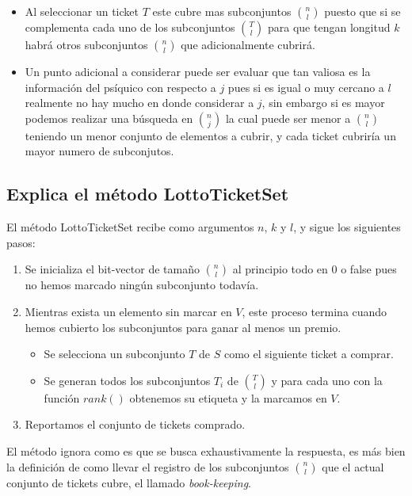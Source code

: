\documentclass[12pt]{article}
\begin{document}
 \begin{itemize}
	\item Al seleccionar un ticket $T$ este cubre mas subconjuntos  ${n}\choose{l}$ puesto que si se complementa cada uno de los subconjuntos ${T}\choose{l}$  para que tengan longitud $k$ habrá otros subconjuntos  ${n}\choose{l}$ que adicionalmente cubrirá.
	\item Un punto adicional a considerar puede ser evaluar que tan valiosa es la información del psíquico con respecto a $j$ pues si es igual o muy cercano a $l$ realmente no hay mucho en donde considerar a $j$, sin embargo si es mayor podemos realizar una búsqueda en ${n}\choose{j}$ la cual puede ser menor a ${n}\choose{l}$ teniendo un menor conjunto de elementos a cubrir, y cada ticket cubriría un mayor numero de subconjutos.
\end{itemize}
\subsection{Explica el método LottoTicketSet}
El método LottoTicketSet recibe como argumentos $n$, $k$ y $l$, y sigue los siguientes pasos:
 \begin{enumerate}
	\item Se inicializa el bit-vector de tamaño ${n}\choose{l}$ al principio todo en 0 o false pues no hemos marcado ningún subconjunto todavía.
	\item Mientras exista un elemento sin marcar en $V$, este proceso termina cuando hemos cubierto los subconjuntos para ganar al menos un premio.
	\begin{itemize}
		\item Se selecciona un subconjunto $T$ de $S$ como el siguiente ticket a comprar.
		\item Se generan todos los subconjuntos $T_{i}$ de ${T}\choose{l}$ y para cada uno con la función $rank()$ obtenemos su etiqueta y la marcamos en $V$.
	\end{itemize}
	\item Reportamos el conjunto de tickets comprado.
\end{enumerate}
	El método ignora como es que se busca exhaustivamente la respuesta, es más bien la definición de como llevar el registro de los subconjuntos ${n}\choose{l}$ que el actual conjunto de tickets cubre, el llamado \textit{book-keeping}.
\end{document}

